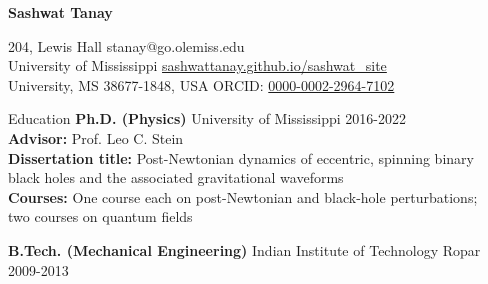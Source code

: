 \documentclass{resume} %
\begin{document}
  


  
  
\begin{center}
    {\LARGE \bf Sashwat Tanay} \\  
\end{center}



204, Lewis Hall                                                      \hfill {stanay@go.olemiss.edu} \\
University of Mississippi                                       \hfill  \href{https://sashwattanay.github.io/sashwat_site}{sashwattanay.github.io/sashwat\_site} \\
University, MS 38677-1848, USA                          \hfill     ORCID: \href{https://orcid.org/0000-0002-2964-7102}{0000-0002-2964-7102}       \\

\begin{rSection}{Education}
{\bf Ph.D. (Physics) } University of Mississippi \hfill {2016-2022}  \\
\hspace*{1cm} {\bf Advisor:} Prof. Leo C. Stein \\
\hspace*{1cm} {\bf Dissertation title:} Post-Newtonian dynamics of eccentric, spinning binary\\
\hspace*{4.6 cm} black holes and the associated gravitational waveforms \\
\hspace*{1cm} {\bf Courses:} One course each on post-Newtonian and black-hole perturbations; \\
\hspace*{2.8cm} two courses on quantum fields

{\bf B.Tech. (Mechanical Engineering) } Indian Institute of Technology Ropar \hfill {2009-2013}  

\end{rSection}



  
\end{document}
